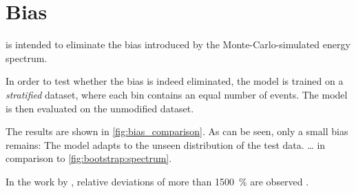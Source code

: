\section{Bias}
\dsea{} is intended to eliminate the bias introduced by the Monte-Carlo-simulated energy spectrum.

In order to test
whether the bias is indeed eliminated,
the model is trained on a \emph{stratified} dataset,
where each bin contains an equal number of events.
The model is then evaluated on the unmodified dataset.

The results are shown in \autoref{fig:bias_comparison}.
As can be seen,
only a small bias remains:
The model adapts to the unseen distribution of the test data.
… in comparison to \autoref{fig:bootstrap:spectrum}.

In the work by \citeauthor{dsea_samuel},
relative deviations of more than \SI{1500}{\percent} are observed \cite{dsea_samuel}.



